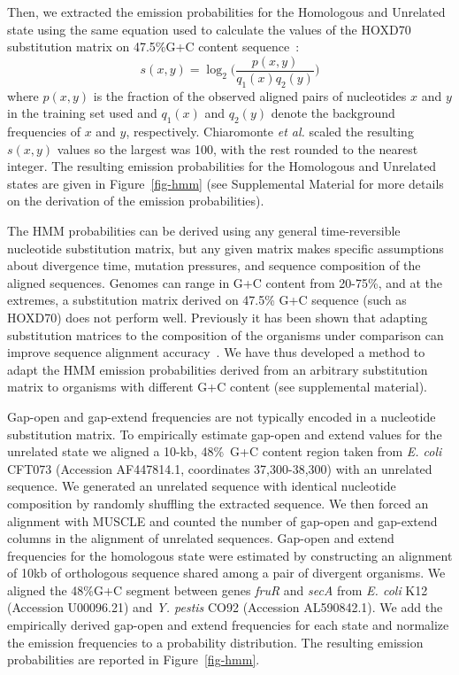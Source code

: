 \documentclass[9.5pt,journal,final,finalsubmission,twocolumn]{IEEEtran}
\begin{document}
\normalsize
Then, we extracted the emission probabilities for the 
Homologous and Unrelated state using the same equation used to
calculate the values of the HOXD70 substitution matrix on 47.5\%G+C
content sequence~\cite{hoxd}:
\begin{equation}
s(x,y)= \log_{2}{\Bigg(\frac{p(x,y)}{q_{1}(x)q_{2}(y)}\Bigg)}
\end{equation}
{w}here $p(x,y)$ is the fraction of the observed aligned pairs of
nucleotides $x$ and $y$ in the training set used and $q_{1}(x)$ and
$q_{2}(y)$ denote the background frequencies of $x$ and $y$,
respectively. Chiaromonte \textit{et al.} scaled the resulting
$s(x,y)$ values so the largest was 100,
with the rest rounded to the nearest integer. The resulting emission
probabilities for the Homologous and Unrelated states are given
in Figure~\ref{fig-hmm} (see Supplemental Material for
more details on the derivation of the emission probabilities).


The HMM probabilities can be derived using any general time-reversible nucleotide substitution matrix,
but any given matrix makes specific assumptions about divergence time, mutation pressures,
and sequence composition of the aligned sequences.
Genomes can range in G+C content from 20-75\%, and at the extremes,
a substitution matrix derived on 47.5\% G+C sequence (such as HOXD70) does not
perform well. Previously it has been shown that adapting substitution matrices to the composition
of the organisms under comparison can improve sequence alignment accuracy~\cite{ref-rev3a,ref-rev3b}. We have thus developed a  method to adapt the HMM emission
probabilities derived from an arbitrary substitution matrix
to organisms with different G+C content (see supplemental material).

Gap-open and gap-extend frequencies are not typically encoded in a nucleotide substitution matrix.  To empirically estimate gap-open and extend values
for the unrelated state we aligned a 10-kb, 48\%~G+C content region
taken from \emph{E. coli} CFT073 (Accession AF447814.1, coordinates
37,300-38,300) with an unrelated sequence.  We generated an unrelated
sequence with identical nucleotide composition by randomly shuffling the
extracted sequence.  We then forced an
alignment with MUSCLE and counted the number of gap-open and gap-extend
columns in the alignment of unrelated sequences.  Gap-open and
extend frequencies for the homologous state were estimated by
constructing an alignment of 10kb of orthologous sequence shared among
a pair of divergent organisms.  We aligned the 48\%G+C segment between
genes \textit{fruR} and \textit{secA} from \textit{E. coli} K12
(Accession U00096.21) and \emph{Y. pestis} CO92 (Accession
AL590842.1). We add the empirically derived gap-open and extend
frequencies for each state and normalize the emission frequencies to a
probability distribution.  The resulting emission probabilities are
reported in Figure~\ref{fig-hmm}.
\end{document}
